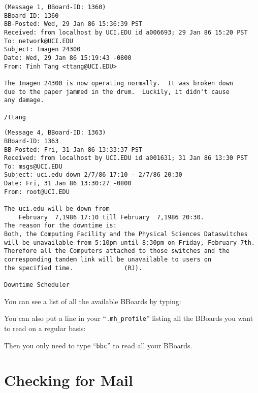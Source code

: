 \newpage
\begin{footnotesize}
\baselineskip=12pt\parskip=0pt
\begin{verbatim}
(Message 1, BBoard-ID: 1360)
BBoard-ID: 1360
BB-Posted: Wed, 29 Jan 86 15:36:39 PST
Received: from localhost by UCI.EDU id a006693; 29 Jan 86 15:20 PST
To: network@UCI.EDU
Subject: Imagen 24300
Date: Wed, 29 Jan 86 15:19:43 -0800
From: Tinh Tang <ttang@UCI.EDU>

The Imagen 24300 is now operating normally.  It was broken down
due to the paper jammed in the drum.  Luckily, it didn't cause
any damage.

/ttang
\end{verbatim}\begin{verbatim}
(Message 4, BBoard-ID: 1363)
BBoard-ID: 1363
BB-Posted: Fri, 31 Jan 86 13:33:37 PST
Received: from localhost by UCI.EDU id a001631; 31 Jan 86 13:30 PST
To: msgs@UCI.EDU
Subject: uci.edu down 2/7/86 17:10 - 2/7/86 20:30
Date: Fri, 31 Jan 86 13:30:27 -0800
From: root@UCI.EDU

The uci.edu will be down from
	February  7,1986 17:10 till February  7,1986 20:30.
The reason for the downtime is:
Both, the Computing Facility and the Physical Sciences Dataswitches 
will be unavailable from 5:10pm until 8:30pm on Friday, February 7th. 
Therefore all the Computers attached to those switches and the 
corresponding tandem link will be unavailable to users on 
the specified time.              (RJ).

Downtime Scheduler
\end{verbatim}
\leftline{\tt \%}
\end{footnotesize}
\newpage

You can see a list of all the available BBoards by typing:


You can also put a line in your ``\verb|.mh_profile|'' listing all
the BBoards you want to read on a regular basis:


Then you only need to type ``\verb|bbc|'' to read all your BBoards. 


\section{Checking for Mail}

